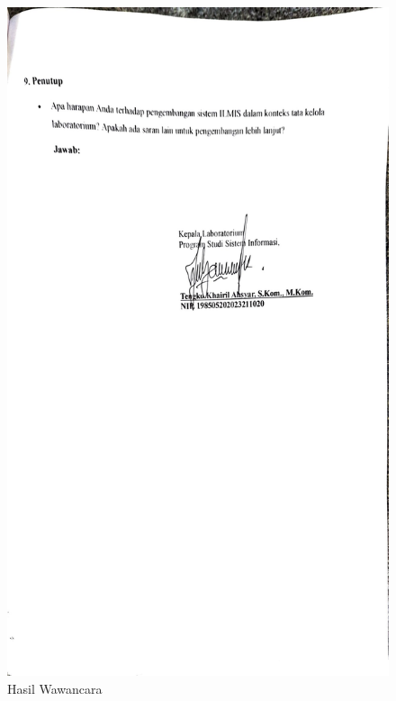 \begin{figure}[h]
	\centering
	\includegraphics[width=0.82\linewidth]{konten/gambar/wawancara/wawancara_5.jpg}
	\caption{Hasil Wawancara}
	\label{fig:hasil-wawancara}
\end{figure}


